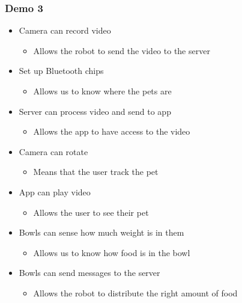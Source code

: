         \subsubsection{Demo 3}
            \begin{itemize}
                \setlength{\itemindent}{.2in}
                \item Camera can record video
                    \begin{itemize}
                        \setlength{\itemindent}{.3in}
                        \item Allows the robot to send the video to the server
                    \end{itemize}
                \item Set up Bluetooth chips
                    \begin{itemize}
                        \setlength{\itemindent}{.3in}
                        \item Allows us to know where the pets are 
                    \end{itemize}
                \item Server can process video and send to app
                    \begin{itemize}
                        \setlength{\itemindent}{.3in}
                        \item Allows the app to have access to the video 
                    \end{itemize}
                \item Camera can rotate
                    \begin{itemize}
                        \setlength{\itemindent}{.3in}
                        \item Means that the user track the pet
                    \end{itemize}
                \item App can play video
                    \begin{itemize}
                        \setlength{\itemindent}{.3in}
                        \item Allows the user to see their pet 
                    \end{itemize}
                \item Bowls can sense how much weight is in them
                    \begin{itemize}
                        \setlength{\itemindent}{.3in}
                        \item Allows us to know how food is in the bowl
                    \end{itemize}
                \item Bowls can send messages to the server
                    \begin{itemize}
                        \setlength{\itemindent}{.3in}
                        \item Allows the robot to distribute the right amount of food
                    \end{itemize}
            \end{itemize}
